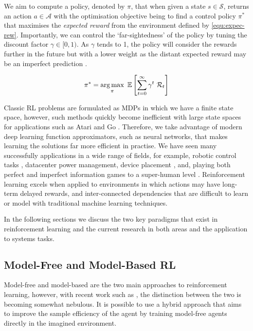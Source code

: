 We aim to compute a policy, denoted by $\pi$, that when given a state $s \in \mathcal{S}$, returns an action $a \in \mathcal{A}$ with the optimisation objective being to find a control policy $\pi^*$ that maximises the \textit{expected reward} from the environment defined by \ref{equ:expec-rew}. Importantly, we can control the `far-sightedness' of the policy by tuning the discount factor $\gamma \in [0, 1)$. As $\gamma$ tends to 1, the policy will consider the rewards further in the future but with a lower weight as the distant expected reward may be an imperfect prediction \cite{bellman1957}.

\begin{equation}
  \label{equ:expec-rew}
  \pi^* = \operatorname*{arg\,max}_\pi~\mathbb{E} \left[ \sum^\infty_{t=0} \gamma^t~\mathcal{R}_t \right]
\end{equation}

Classic RL problems are formulated as MDPs in which we have a finite state space, however, such methods quickly become inefficient with large state spaces for applications such as Atari \cite{mnih2013playing, kaiser2020modelbased} and Go \cite{silver2017mastering}. Therefore, we take advantage of modern deep learning function approximators, such as neural networks, that makes learning the solutions far more efficient in practise. We have seen many successfully applications in a wide range of fields, for example, robotic control tasks \cite{openai2019solving}, datacenter power management, device placement \cite{addanki2019placeto, mirhoseini2018hierarchical}, and, playing both perfect and imperfect information games to a super-human level \cite{silver2016mastering,silver2017mastering}. Reinforcement learning excels when applied to environments in which actions may have long-term delayed rewards, and inter-connected dependencies that are difficult to learn or model with traditional machine learning techniques.

In the following sections we discuss the two key paradigms that exist in reinforcement learning and the current research in both areas and the application to systems tasks.

\subsection{Model-Free and Model-Based RL}

Model-free and model-based are the two main approaches to reinforcement learning, however, with recent work such as \cite{app10196685, kaiser2020modelbased, robine2021smaller}, the distinction between the two is becoming somewhat nebulous. It is possible to use a hybrid approach that aims to improve the sample efficiency of the agent by training model-free agents directly in the imagined environment.

